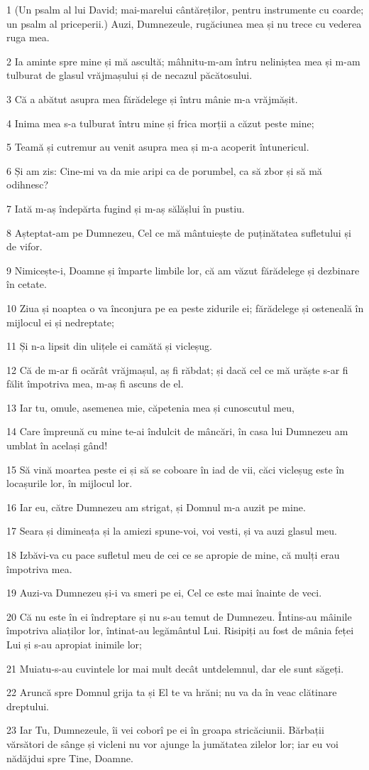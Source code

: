 \par 1 (Un psalm al lui David; mai-marelui cântăreților, pentru instrumente cu coarde; un psalm al priceperii.) Auzi, Dumnezeule, rugăciunea mea și nu trece cu vederea ruga mea.
\par 2 Ia aminte spre mine și mă ascultă; mâhnitu-m-am întru neliniștea mea și m-am tulburat de glasul vrăjmașului și de necazul păcătosului.
\par 3 Că a abătut asupra mea fărădelege și întru mânie m-a vrăjmășit.
\par 4 Inima mea s-a tulburat întru mine și frica morții a căzut peste mine;
\par 5 Teamă și cutremur au venit asupra mea și m-a acoperit întunericul.
\par 6 Și am zis: Cine-mi va da mie aripi ca de porumbel, ca să zbor și să mă odihnesc?
\par 7 Iată m-aș îndepărta fugind și m-aș sălășlui în pustiu.
\par 8 Așteptat-am pe Dumnezeu, Cel ce mă mântuiește de puținătatea sufletului și de vifor.
\par 9 Nimicește-i, Doamne și împarte limbile lor, că am văzut fărădelege și dezbinare în cetate.
\par 10 Ziua și noaptea o va înconjura pe ea peste zidurile ei; fărădelege și osteneală în mijlocul ei și nedreptate;
\par 11 Și n-a lipsit din ulițele ei camătă și vicleșug.
\par 12 Că de m-ar fi ocărât vrăjmașul, aș fi răbdat; și dacă cel ce mă urăște s-ar fi fălit împotriva mea, m-aș fi ascuns de el.
\par 13 Iar tu, omule, asemenea mie, căpetenia mea și cunoscutul meu,
\par 14 Care împreună cu mine te-ai îndulcit de mâncări, în casa lui Dumnezeu am umblat în același gând!
\par 15 Să vină moartea peste ei și să se coboare în iad de vii, căci vicleșug este în locașurile lor, în mijlocul lor.
\par 16 Iar eu, către Dumnezeu am strigat, și Domnul m-a auzit pe mine.
\par 17 Seara și dimineața și la amiezi spune-voi, voi vesti, și va auzi glasul meu.
\par 18 Izbăvi-va cu pace sufletul meu de cei ce se apropie de mine, că mulți erau împotriva mea.
\par 19 Auzi-va Dumnezeu și-i va smeri pe ei, Cel ce este mai înainte de veci.
\par 20 Că nu este în ei îndreptare și nu s-au temut de Dumnezeu. Întins-au mâinile împotriva aliaților lor, întinat-au legământul Lui. Risipiți au fost de mânia feței Lui și s-au apropiat inimile lor;
\par 21 Muiatu-s-au cuvintele lor mai mult decât untdelemnul, dar ele sunt săgeți.
\par 22 Aruncă spre Domnul grija ta și El te va hrăni; nu va da în veac clătinare dreptului.
\par 23 Iar Tu, Dumnezeule, îi vei coborî pe ei în groapa stricăciunii. Bărbații vărsători de sânge și vicleni nu vor ajunge la jumătatea zilelor lor; iar eu voi nădăjdui spre Tine, Doamne.

